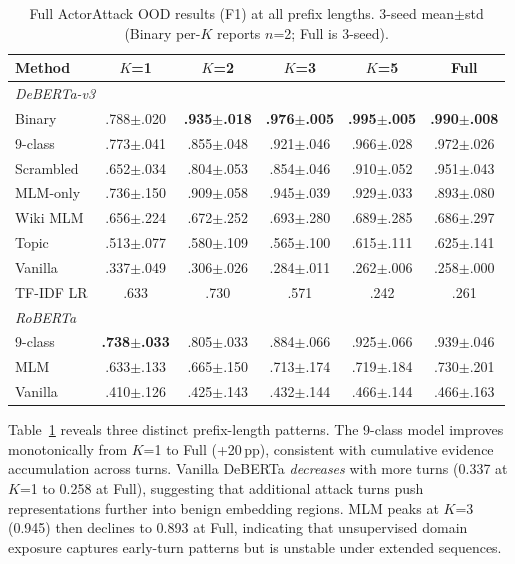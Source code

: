 \begin{table}[t]
\centering
\small
\caption{Full ActorAttack OOD results (F1) at all prefix lengths. 3-seed mean$\pm$std (Binary per-$K$ reports $n$=2; Full is 3-seed).}
\label{tab:actorattack_full}
\begin{tabular}{@{}lccccc@{}}
\toprule
\textbf{Method} & $K$=1 & $K$=2 & $K$=3 & $K$=5 & Full \\
\midrule
\multicolumn{6}{l}{\textit{DeBERTa-v3}} \\[2pt]
Binary & .788$\pm$.020 & \textbf{.935$\pm$.018} & \textbf{.976$\pm$.005} & \textbf{.995$\pm$.005} & \textbf{.990$\pm$.008} \\
9-class & .773$\pm$.041 & .855$\pm$.048 & .921$\pm$.046 & .966$\pm$.028 & .972$\pm$.026 \\
Scrambled & .652$\pm$.034 & .804$\pm$.053 & .854$\pm$.046 & .910$\pm$.052 & .951$\pm$.043 \\
MLM-only & .736$\pm$.150 & .909$\pm$.058 & .945$\pm$.039 & .929$\pm$.033 & .893$\pm$.080 \\
Wiki MLM & .656$\pm$.224 & .672$\pm$.252 & .693$\pm$.280 & .689$\pm$.285 & .686$\pm$.297 \\
Topic & .513$\pm$.077 & .580$\pm$.109 & .565$\pm$.100 & .615$\pm$.111 & .625$\pm$.141 \\
Vanilla & .337$\pm$.049 & .306$\pm$.026 & .284$\pm$.011 & .262$\pm$.006 & .258$\pm$.000 \\
TF-IDF LR & .633 & .730 & .571 & .242 & .261 \\
\midrule
\multicolumn{6}{l}{\textit{RoBERTa}} \\[2pt]
9-class & \textbf{.738$\pm$.033} & .805$\pm$.033 & .884$\pm$.066 & .925$\pm$.066 & .939$\pm$.046 \\
MLM & .633$\pm$.133 & .665$\pm$.150 & .713$\pm$.174 & .719$\pm$.184 & .730$\pm$.201 \\
Vanilla & .410$\pm$.126 & .425$\pm$.143 & .432$\pm$.144 & .466$\pm$.144 & .466$\pm$.163 \\
\bottomrule
\end{tabular}
\end{table}

Table~\ref{tab:actorattack_full} reveals three distinct prefix-length patterns. The 9-class model improves monotonically from $K$=1 to Full (+20\,pp), consistent with cumulative evidence accumulation across turns. Vanilla DeBERTa \emph{decreases} with more turns (0.337 at $K$=1 to 0.258 at Full), suggesting that additional attack turns push representations further into benign embedding regions. MLM peaks at $K$=3 (0.945) then declines to 0.893 at Full, indicating that unsupervised domain exposure captures early-turn patterns but is unstable under extended sequences.

